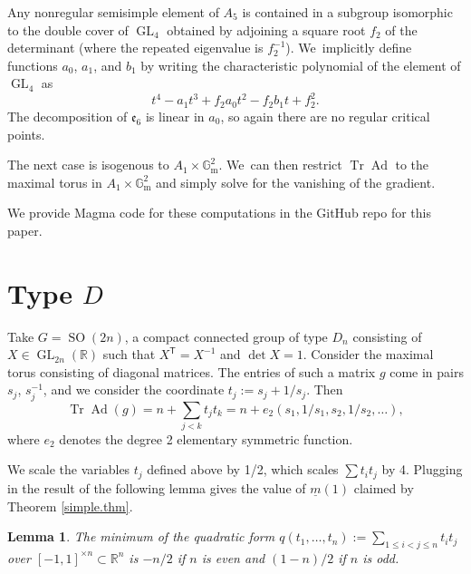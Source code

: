 \documentclass[JEP,XML,SOM,Unicode,NoFloatCountersInSection,published]{cedram}
\newtheorem{lem}[equation]{Lemma}
\theoremstyle{definition}
\newcommand{\mfe}{\mathfrak{e}}
\newcommand{\trans}{\mathsf{T}}
\newcommand{\R}{\mathbb{R}}
\newcommand{\Gm}{\mathbb{G}_{\mathrm{m}}}
\newcommand{\mmin}{\underline{m}}
\DeclareMathOperator{\GL}{GL}
\DeclareMathOperator{\SO}{SO}
\DeclareMathOperator{\Tr}{Tr}
\DeclareMathOperator{\Ad}{Ad}
\begin{document}
Any nonregular semisimple element of $A_5$ is contained in a subgroup isomorphic to the double cover of $\GL_4$ obtained by adjoining a square root $f_2$ of the determinant (where the repeated eigenvalue is $f_2^{-1}$). We~implicitly define functions $a_0$, $a_1$, and $b_1$ by writing
the characteristic polynomial of the element of $\GL_4$ as
\[
t^4-a_1t^3+f_2a_0t^2-f_2b_1t+f_2^2.
\]
The decomposition of $\mfe_6$ is linear in $a_0$, so again there
are no regular critical points.

The next case is isogenous to $A_1\times \Gm^2$. We~can then restrict $\Tr \Ad$ to the maximal torus in $A_1 \times \Gm^2$ and simply solve for the vanishing
of the gradient.

We provide Magma code for these computations in the GitHub repo for this paper.

\section{Type \texorpdfstring{$D$}{D}} \label{D.sec}

Take $G = \SO(2n)$, a compact connected group of type $D_n$ consisting of $X \in \GL_{2n}(\R)$ such that $X^\trans = X^{-1}$ and $\det X = 1$. Consider the maximal torus consisting of diagonal matrices. The entries of such a matrix $g$ come in pairs $s_j$, $s_j^{-1}$, and we consider the coordinate $t_j := s_j + 1/s_j$. Then
\begin{equation} \label{D.ad}
\Tr \Ad(g) = n + \sum_{j < k} t_j t_k = n + e_2(s_1, 1/s_1, s_2, 1/s_2, \ldots),
\end{equation}
where $e_2$ denotes the degree 2 elementary symmetric function.

We scale the variables $t_j$ defined above by 1/2, which scales $\sum t_i t_j$ by 4. Plugging in the result of the following lemma gives the value of $\mmin(1)$ claimed by Theorem \ref{simple.thm}.

\begin{lem} \label{D.lem}
The minimum of the quadratic form $q(t_1, \ldots, t_n) := \sum_{1 \le i < j \le n} t_i t_j$ over $[-1, 1]^{\times n} \subset \R^n$ is $-n/2$ if $n$ is even and $(1-n)/2$ if $n$ is odd.
\end{lem}
\end{document}
